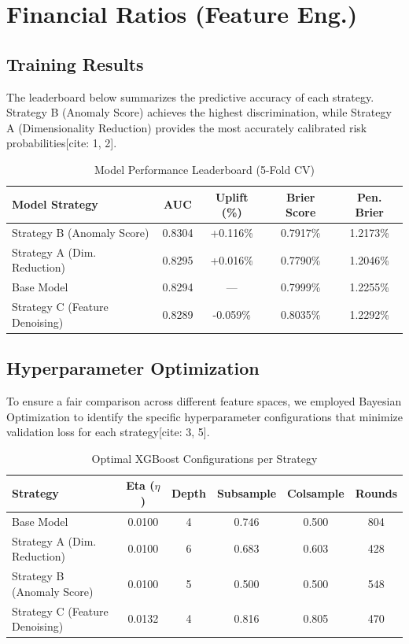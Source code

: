 \documentclass{report}\usepackage[]{graphicx}\usepackage[]{xcolor}
\begin{document}
\section{Financial Ratios (Feature Eng.)}

\subsection{Training Results}

The leaderboard below summarizes the predictive accuracy of each strategy. Strategy B (Anomaly Score) achieves the highest discrimination, while Strategy A (Dimensionality Reduction) provides the most accurately calibrated risk probabilities[cite: 1, 2].

\begin{table}[H]
\centering
\caption{Model Performance Leaderboard (5-Fold CV)}
\label{tab:leaderboard}
\begin{tabular}{lcccc}
\hline
\textbf{Model Strategy} & \textbf{AUC} & \textbf{Uplift (\%)} & \textbf{Brier Score} & \textbf{Pen. Brier} \\ 
\hline
Strategy B (Anomaly Score)      & 0.8304 & +0.116\% & 0.7917\% & 1.2173\% \\
Strategy A (Dim. Reduction)     & 0.8295 & +0.016\% & 0.7790\% & 1.2046\% \\
Base Model                      & 0.8294 & ---      & 0.7999\% & 1.2255\% \\
Strategy C (Feature Denoising)  & 0.8289 & -0.059\% & 0.8035\% & 1.2292\% \\
\hline
\end{tabular}
\end{table}

\subsection{Hyperparameter Optimization}

To ensure a fair comparison across different feature spaces, we employed Bayesian Optimization to identify the specific hyperparameter configurations that minimize validation loss for each strategy[cite: 3, 5].



\begin{table}[H]
\centering
\caption{Optimal XGBoost Configurations per Strategy}
\label{tab:params}
\begin{tabular}{lccccc}
\hline
\textbf{Strategy} & \textbf{Eta ($\eta$)} & \textbf{Depth} & \textbf{Subsample} & \textbf{Colsample} & \textbf{Rounds} \\ 
\hline
Base Model                     & 0.0100 & 4 & 0.746 & 0.500 & 804 \\
Strategy A (Dim. Reduction)    & 0.0100 & 6 & 0.683 & 0.603 & 428 \\
Strategy B (Anomaly Score)     & 0.0100 & 5 & 0.500 & 0.500 & 548 \\
Strategy C (Feature Denoising) & 0.0132 & 4 & 0.816 & 0.805 & 470 \\
\hline
\end{tabular}
\end{table}
\end{document}
